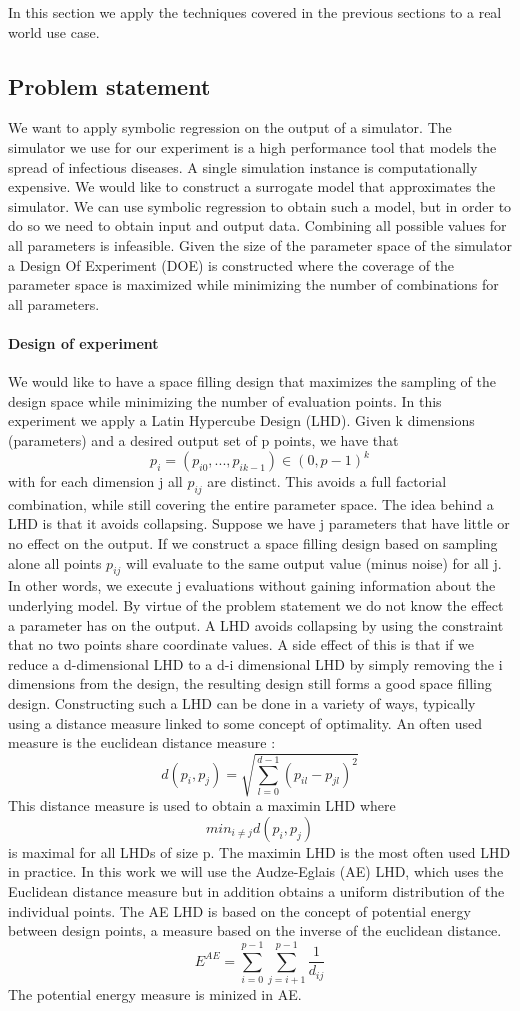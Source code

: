 In this section we apply the techniques covered in the previous sections to a real world use case.
\subsection{Problem statement}
We want to apply symbolic regression on the output of a simulator. The simulator we use for our experiment is a high performance tool \citep{stride} that models the spread of infectious diseases. A single simulation instance is computationally expensive. We would like to construct a surrogate model that approximates the simulator. We can use symbolic regression to obtain such a model, but in order to do so we need to obtain input and output data. Combining all possible values for all parameters is infeasible. 
Given the size of the parameter space of the simulator a Design Of Experiment (DOE) is constructed where the coverage of the parameter space is maximized while minimizing the number of combinations for all parameters. 
\paragraph{Design of experiment}
We would like to have a space filling design that maximizes the sampling of the design space while minimizing the number of evaluation points.
In this experiment we apply a Latin Hypercube Design (LHD). 
Given k dimensions (parameters) and a desired output set of p points, we have that 
\[
p_i = (p_{i0}, ..., p_{i k-1}) \in (0, p -1)^k
\]
with for each dimension j all $p_{ij}$ are distinct. This avoids a full factorial combination, while still covering the entire parameter space. 
The idea behind a LHD is that it avoids collapsing. Suppose we have j parameters that have little or no effect on the output. If we construct a space filling design based on sampling alone all points $p_{ij}$ will evaluate to the same output value (minus noise) for all j. In other words, we execute j evaluations without gaining information about the underlying model. By virtue of the problem statement we do not know the effect a parameter has on the output. A LHD avoids collapsing by using the constraint that no two points share coordinate values. A side effect of this is that if we reduce a d-dimensional LHD to a d-i dimensional LHD by simply removing the i dimensions from the design, the resulting design still forms a good space filling design.
Constructing such a LHD can be done in a variety of ways, typically using a distance measure linked to some concept of optimality. An often used measure is the euclidean distance measure :
\[
d(p_i, p_j) = \sqrt{\sum_{l=0}^{d-1}(p_{il}-p_{jl})^2}
\]
This distance measure is used to obtain a maximin LHD where
\[
min_{i \neq j} d(p_i,p_j)
\]
is maximal for all LHDs of size p. The maximin LHD is the most often used LHD in practice. In this work we will use the Audze-Eglais \citep{AudzeEglais, AudzeEglais2, AudzeEglais3} (AE) LHD, which uses the Euclidean distance measure but in addition obtains a uniform distribution of the individual points. 
The AE LHD is based on the concept of potential energy between design points, a measure based on the inverse of the euclidean distance.
\[
E^{AE} = \sum_{i=0}^{p-1} {\sum_{j=i+1}^{p-1} {\frac{1}{d_{ij}}}}
\]
The potential energy measure is minized in AE.
